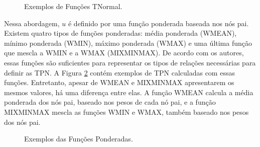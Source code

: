 \begin{figure}[ht!]
\begin{center}
	\end{center}
	\caption{Exemplos de Funções TNormal.}
	\label{modelo:funcoes:tnormal}
\end{figure}

Nessa abordagem, $u$ é definido por uma função ponderada baseada nos nós pai. Existem quatro tipos de funções ponderadas: média ponderada (WMEAN), mínimo ponderada (WMIN), máximo ponderada (WMAX) e uma última função que mescla a WMIN e a WMAX (MIXMINMAX). De acordo com os autores, essas funções são suficientes para representar os tipos de relações necessárias para definir as TPN. A Figura \ref{modelo:funcoes:ponderadas} contém exemplos de TPN calculadas com essas funções. Entretanto, apesar de WMEAN e MIXMINMAX apresentarem os mesmos valores, há uma diferença entre elas. A função WMEAN calcula a média ponderada dos nós pai, baseado nos pesos de cada nó pai, e a função MIXMINMAX mescla as funções WMIN e WMAX, também baseado nos pesos dos nós pai.

\begin{figure}[ht!]
\begin{center}
	\end{center}
	\caption{Exemplos das Funções Ponderadas.}
	\label{modelo:funcoes:ponderadas}
\end{figure}

